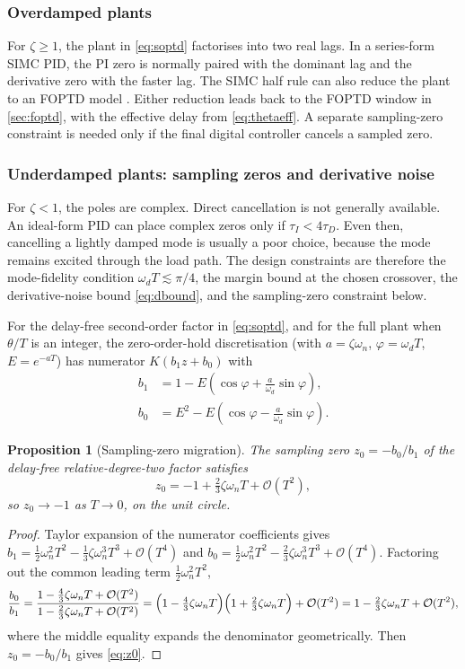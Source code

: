 \documentclass[a4paper,fleqn]{cas-sc}
\newtheorem{proposition}{Proposition}
\theoremstyle{remark}
\newcommand{\wn}{\omega_n}
\newcommand{\wdamp}{\omega_d}
\begin{document}
\subsubsection{Overdamped plants}
For $\zeta\ge1$, the plant in \cref{eq:soptd} factorises into two real lags. In a series-form SIMC PID, the PI zero is normally paired with the dominant lag and the derivative zero with the faster lag. The SIMC half rule can also reduce the plant to an FOPTD model \citep{skogestad2003simc}. Either reduction leads back to the FOPTD window in \cref{sec:foptd}, with the effective delay from \cref{eq:thetaeff}. A separate sampling-zero constraint is needed only if the final digital controller cancels a sampled zero.

\subsubsection{Underdamped plants: sampling zeros and derivative noise}
For $\zeta<1$, the poles are complex. Direct cancellation is not generally
available. An ideal-form PID can place complex zeros only if
$\tau_I<4\tau_D$. Even then, cancelling a lightly damped mode is usually a poor
choice, because the mode remains excited through the load path. The design
constraints are therefore the mode-fidelity condition
$\wdamp T\lesssim\pi/4$, the margin bound at the chosen crossover, the
derivative-noise bound \cref{eq:dbound}, and the sampling-zero constraint
below.

For the delay-free second-order factor in \cref{eq:soptd}, and for the full
plant when $\theta/T$ is an integer, the zero-order-hold discretisation (with
$a=\zeta\wn$, $\varphi=\wdamp T$, $E=e^{-aT}$) has numerator
$K(b_1 z+b_0)$ with
\begin{align}
b_1&=1-E\!\left(\cos\varphi+\tfrac{a}{\wdamp}\sin\varphi\right),\\
b_0&=E^2-E\!\left(\cos\varphi-\tfrac{a}{\wdamp}\sin\varphi\right).
\end{align}
\begin{proposition}[Sampling-zero migration]
\label{prop:zero}
The sampling zero $z_0=-b_0/b_1$ of the delay-free relative-degree-two factor
satisfies
\begin{equation}
z_0=-1+\tfrac{2}{3}\zeta\wn T+\mathcal{O}(T^2),
\label{eq:z0}
\end{equation}
so $z_0\to-1$ as $T\to0$, on the unit circle.
\end{proposition}
\begin{proof}
Taylor expansion of the numerator coefficients gives
$b_1=\frac12\wn^2T^2-\frac13\zeta\wn^3T^3+\mathcal{O}(T^4)$ and
$b_0=\frac12\wn^2T^2-\frac23\zeta\wn^3T^3+\mathcal{O}(T^4)$.
Factoring out the common leading term $\frac12\wn^2T^2$,
\begin{equation*}
\frac{b_0}{b_1}
=\frac{1-\frac{4}{3}\zeta\wn T+\mathcal{O}(T^2)}{1-\frac{2}{3}\zeta\wn T+\mathcal{O}(T^2)}
=\Bigl(1-\tfrac{4}{3}\zeta\wn T\Bigr)\Bigl(1+\tfrac{2}{3}\zeta\wn T\Bigr)+\mathcal{O}(T^2)
=1-\tfrac{2}{3}\zeta\wn T+\mathcal{O}(T^2),
\end{equation*}
where the middle equality expands the denominator geometrically. Then
$z_0=-b_0/b_1$ gives \cref{eq:z0}.
\end{proof}
\end{document}

